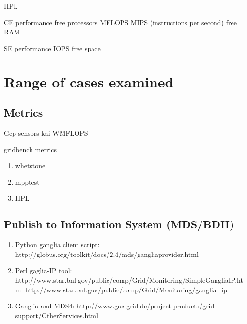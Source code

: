 HPL
\cite{gridbench}

CE performance
free processors
MFLOPS
MIPS (instructions per second)
free RAM

SE performance
IOPS
free space

\section{Range of cases examined}
\subsection{Metrics}
Gcp sensors kai WMFLOPS
\cite{gcpsensor}

gridbench metrics
\begin{enumerate}
  \item whetstone
  \item mpptest
  \item HPL
\end{enumerate}
\cite{gridbench} 

\subsection{Publish to Information System (MDS/BDII)}
\begin{enumerate}
  \item Python ganglia client script:
  http://globus.org/toolkit/docs/2.4/mds/gangliaprovider.html
  \item Perl gaglia-IP tool:
  http://www.star.bnl.gov/public/comp/Grid/Monitoring/SimpleGangliaIP.html
  http://www.star.bnl.gov/public/comp/Grid/Monitoring/ganglia_ip
  \item Ganglia and MDS4:
  http://www.gac-grid.de/project-products/grid-support/OtherServices.html
\end{enumerate}